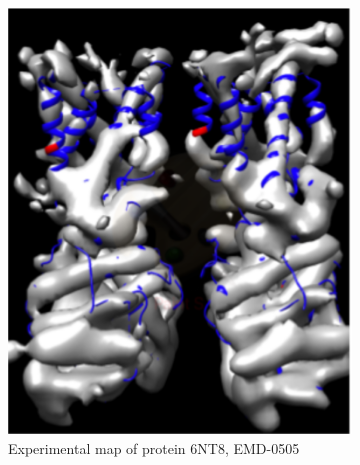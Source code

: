\begin{figure}[!ht]
\begin{minipage}[b]{0.45\linewidth}
\begin{subfigure}[b]{\linewidth}
	\includegraphics[width=1.0\textwidth]{picsnew/6nt8_real.png}
	\caption{Experimental map of protein 6NT8, EMD-0505}
	\label{f:6nt8_real}
\end{subfigure}
\end{minipage}
\begin{minipage}[b]{0.45\linewidth}
\begin{subfigure}[b]{\linewidth}

\end{subfigure}
\end{minipage}
\end{figure}
